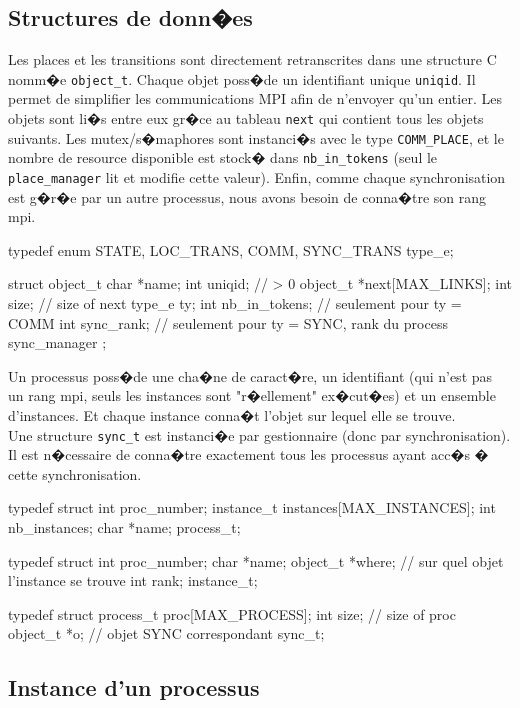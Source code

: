 \documentclass[10pt,a4paper]{article}
\begin{document}
\subsection{Structures de donn�es}

Les places et les transitions sont directement retranscrites dans une structure
C nomm�e {\tt object\_t}. Chaque objet poss�de un identifiant unique 
{\tt uniqid}. Il permet de simplifier les communications MPI afin de n'envoyer 
qu'un entier. Les objets sont li�s entre eux gr�ce au tableau {\tt next} qui
contient tous les objets suivants. Les mutex/s�maphores sont instanci�s avec
le type {\tt COMM\_PLACE}, et le nombre de resource disponible est stock�
dans {\tt nb\_in\_tokens} (seul le {\tt place\_manager} lit et modifie cette valeur).
Enfin, comme chaque synchronisation est g�r�e par un autre processus, nous avons
besoin de conna�tre son rang mpi.

\begin{codec}
typedef enum {
  STATE, LOC_TRANS, COMM, SYNC_TRANS
} type_e;

struct object_t {
  char *name;
  int uniqid; // > 0
  object_t *next[MAX_LINKS];
  int size; // size of next
  type_e ty;
  int nb_in_tokens; // seulement pour ty = COMM
  int sync_rank; // seulement pour ty = SYNC, rank du process sync_manager
};
\end{codec}

Un processus poss�de une cha�ne de caract�re, un identifiant (qui n'est pas
un rang mpi, seuls les instances sont "r�ellement" ex�cut�es) et un
ensemble d'instances. Et chaque instance conna�t l'objet sur lequel elle
se trouve.\\

Une structure {\tt sync\_t} est instanci�e par gestionnaire (donc par 
synchronisation). Il est n�cessaire de conna�tre exactement tous les 
processus ayant acc�s � cette synchronisation.

\begin{codec}
typedef struct {
  int proc_number;
  instance_t instances[MAX_INSTANCES];
  int nb_instances;
  char *name;
} process_t;

typedef struct {
  int proc_number;
  char *name;
  object_t *where; // sur quel objet l'instance se trouve
  int rank;
} instance_t;

typedef struct {
  process_t proc[MAX_PROCESS];
  int size; // size of proc
  object_t *o; // objet SYNC correspondant
} sync_t;
\end{codec}


\subsection{Instance d'un processus}
\end{document}
